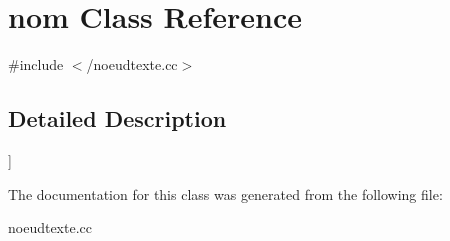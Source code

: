 \hypertarget{classnom}{\section{nom Class Reference}
\label{classnom}
}


{\ttfamily \#include $<$/noeudtexte.\-cc$>$}



\subsection{Detailed Description}
\mbox{]} 

The documentation for this class was generated from the following file\-:\begin{DoxyCompactItemize}
\item 
noeudtexte.\-cc\end{DoxyCompactItemize}
